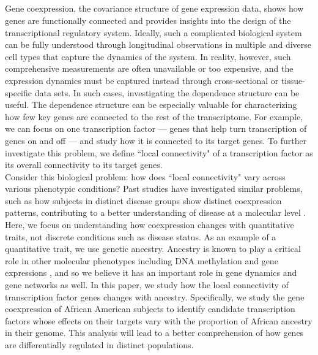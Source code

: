 \documentclass[aap, preprint]{imsart}
\numberwithin{equation}{section}
\theoremstyle{plain}
\begin{document}
\subsection*{}
Gene coexpression, the covariance structure of gene expression data, shows how genes are functionally connected and provides insights into the design of the transcriptional regulatory system. Ideally, such a complicated biological system can be fully understood through longitudinal observations in multiple and diverse cell types that capture the dynamics of the system. In reality, however, such comprehensive measurements are often unavailable or too expensive, and the expression dynamics must be captured instead through cross-sectional or tissue-specific data sets. In such cases, investigating the dependence structure can be useful. The dependence structure can be especially valuable for characterizing how few key genes are connected to the rest of the transcriptome. For example, we can focus on one transcription factor --- genes that help turn transcription of genes on and off --- and study how it is connected to its target genes. To further investigate this problem, we define ``local connectivity" of a transcription factor as its overall connectivity to its target genes.\\

Consider this biological problem: how does ``local connectivity" vary across various phenotypic conditions?  Past studies have investigated similar problems, such as how subjects in distinct disease groups show distinct coexpression patterns, contributing to a better understanding of disease at a molecular level \cite{de2010differential}. Here, we focus on understanding how coexpression changes with quantitative traits, not discrete conditions such as disease status. As an example of a quantitative trait, we use genetic ancestry. Ancestry is known to play a critical role in other molecular phenotypes including DNA methylation and gene expressions \cite{galanter2017differential, price2008effects}, and so we believe it has an important role in gene dynamics and gene networks as well. In this paper, we study how the local connectivity of transcription factor genes changes with ancestry. Specifically, we study the gene coexpression of African American subjects to identify candidate transcription factors whose effects on their targets vary with the proportion of African ancestry in their genome. This analysis will lead to a better comprehension of how genes are differentially regulated in distinct populations. \\
\end{document}
